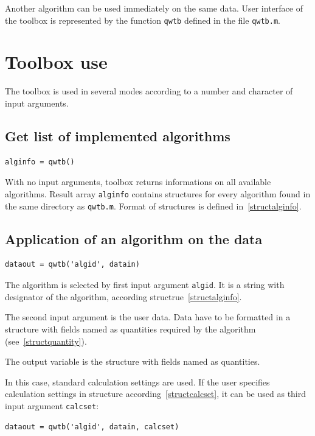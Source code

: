 \documentclass[12pt]{article} %
\begin{document}
Another algorithm can be used immediately on the same data. User interface of the toolbox is represented
by the function \lstinline{qwtb} defined in the file {\tt qwtb.m}.

\section{Toolbox use} %
The toolbox is used in several modes according to a number and character of input arguments.

\subsection{Get list of implemented algorithms}
\begin{lstlisting}
alginfo = qwtb()
\end{lstlisting}

With no input arguments, toolbox returns informations on all available algorithms. Result array
\lstinline{alginfo} contains structures for every algorithm found in the same directory as
\texttt{qwtb.m}. Format of structures is defined in~\ref{structalginfo}.

\subsection{Application of an algorithm on the data} %
\begin{lstlisting}
dataout = qwtb('algid', datain)
\end{lstlisting}

The algorithm is selected by first input argument \lstinline{algid}. It is a string with
designator of the algorithm, according structrue~\ref{structalginfo}.

The second input argument is the user data. Data have to be formatted in a structure with fields
named as quantities required by the algorithm (see~\ref{structquantity}).

The output variable is the structure with fields named as quantities.

In this case, standard calculation settings are used. If the user specifies calculation settings
in structure according~\ref{structcalcset}, it can be used as third input argument
\lstinline{calcset}:

\begin{lstlisting}
dataout = qwtb('algid', datain, calcset)
\end{lstlisting}
\end{document}
